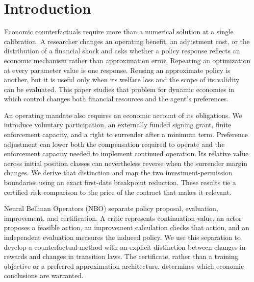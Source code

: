 \section{Introduction}
Economic counterfactuals require more than a numerical solution at a single calibration. A researcher changes an operating benefit, an adjustment cost, or the distribution of a financial shock and asks whether a policy response reflects an economic mechanism rather than approximation error. Repeating an optimization at every parameter value is one response. Reusing an approximate policy is another, but it is useful only when its welfare loss and the scope of its validity can be evaluated. This paper studies that problem for dynamic economies in which control changes both financial resources and the agent's preferences.

An operating mandate also requires an economic account of its obligations. We introduce voluntary participation, an externally funded signing grant, finite enforcement capacity, and a right to surrender after a minimum term. Preference adjustment can lower both the compensation required to operate and the enforcement capacity needed to implement continued operation. Its relative value across initial position classes can nevertheless reverse when the surrender margin changes. We derive that distinction and map the two investment-permission boundaries using an exact first-date breakpoint reduction. These results tie a certified risk comparison to the price of the contract that makes it relevant.

Neural Bellman Operators (NBO) separate policy proposal, evaluation, improvement, and certification. A critic represents continuation value, an actor proposes a feasible action, an improvement calculation checks that action, and an independent evaluation measures the induced policy. We use this separation to develop a counterfactual method with an explicit distinction between changes in rewards and changes in transition laws. The certificate, rather than a training objective or a preferred approximation architecture, determines which economic conclusions are warranted.

